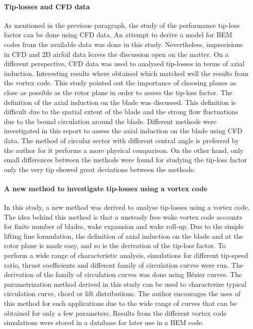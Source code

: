 \documentclass[a4paper,11pt]{book}
\begin{document}
\paragraph{Tip-losses and CFD data} As mentioned in the previous paragraph, the study of the performance tip-loss factor can be done using CFD data. An attempt to derive a model for BEM codes from the available data was done in this study. Nevertheless, imprecisions in CFD and 2D airfoil data leaves the discussion open on the matter. On a different perspective, CFD data was used to analysed tip-losses in terms of axial induction. Interesting results where obtained which matched well the results from the vortex code. This study pointed out the importance of choosing planes as close as possible as the rotor plane in order to assess the tip-loss factor. The definition of the axial induction on the blade was discussed. This definition is difficult due to the spatial extent of the blade and the strong flow fluctuations due to the bound circulation around the blade. Different methods were investigated in this report to assess the axial induction on the blade using CFD data. The method of circular sector with different central angle is preferred by the author for it performs a more physical comparison. On the other hand, only small differences between the methods were found for studying the tip-loss factor only the very tip showed great deviations between the methods.


\paragraph{A new method to investigate tip-losses using a vortex code} In this study, a new method was derived to analyse tip-losses using a vortex code. The idea behind this method is that a unsteady free wake vortex code accounts for finite number of blades, wake expansion and wake roll-up. Due to the simple lifting line formulation, the definition of axial induction on the blade and at the rotor plane is made easy, and so is the derivation of the tip-loss factor. To perform a wide range of characteristic analysis, simulations for different tip-speed ratio, thrust coefficients and different family of circulation curves were run. The derivation of the family of circulation curves was done using B\'ezier curves. The parametrization method derived in this study can be used to characterize typical circulation curve, chord or lift distributions. The author encourages the uses of this method for such applications due to the wide range of curves that can be obtained for only a few parameters. Results from the different vortex code simulations were stored in a database for later use in a BEM code.
\end{document}
